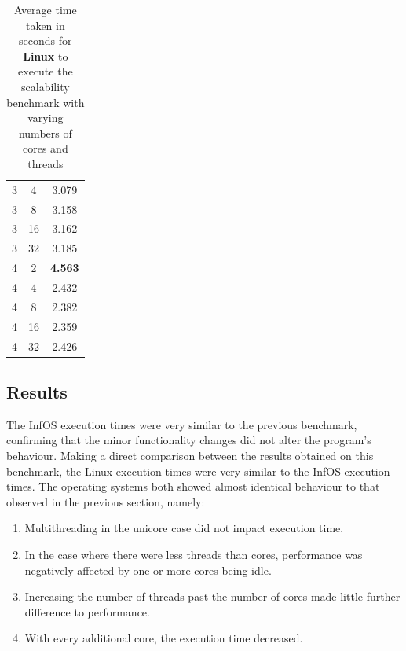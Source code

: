 \documentclass[bsc,frontabs,singlespacing,parskip,deptreport]{infthesis}
\begin{document}
\begin{table}[h]
{\begin{tabular}{ccc}
3 &4 &3.079 \\
3 &8 &3.158 \\
3 &16 &3.162 \\
3 &32 &3.185 \\
\midrule
4 &2 &\textbf{4.563} \\
4 &4 &2.432 \\
4 &8 &2.382 \\
4 &16 &2.359 \\
4 &32 &2.426 \\
\bottomrule
\end{tabular}
\caption{Average time taken in seconds for \textbf{Linux} to execute the scalability benchmark with varying numbers of cores and threads}\label{timing-scalability-linux}
}
\end{table}

\subsection{Results}

The InfOS execution times were very similar to the previous benchmark, confirming that the minor functionality changes did not alter the program's behaviour. Making a direct comparison between the results obtained on this benchmark, the Linux execution times were very similar to the InfOS execution times. The operating systems both showed almost identical behaviour to that observed in the previous section, namely:

\begin{enumerate}
    \item Multithreading in the unicore case did not impact execution time.
    \item In the case where there were less threads than cores, performance was negatively affected by one or more cores being idle.
    \item Increasing the number of threads past the number of cores made little further difference to performance.
    \item With every additional core, the execution time decreased.
\end{enumerate}
\end{document}
